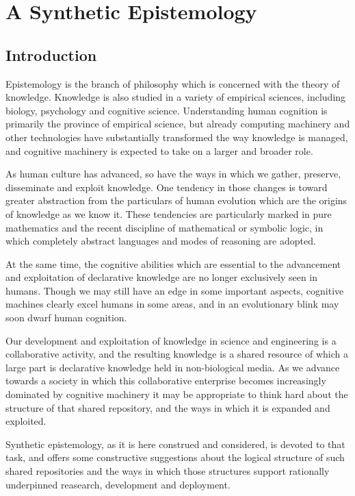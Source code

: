 \documentclass[10pt,titlepage]{book}
\begin{document}
\part{A Synthetic Epistemology}

\chapter{Introduction}

Epistemology is the branch of philosophy which is concerned with the theory of knowledge.
Knowledge is also studied in a variety of empirical sciences, including biology, psychology and cognitive science.
Understanding human cognition is primarily the province of empirical science, but already computing machinery and other technologies have substantially transformed the way knowledge is managed, and cognitive machinery is expected to take on a larger and broader role.

As human culture has advanced, so have the ways in which we gather, preserve, disseminate and exploit knowledge.
One tendency in those changes is toward greater abstraction from the particulars of human evolution which are the origins of knowledge as we know it.
These tendencies are particularly marked in pure mathematics and the recent discipline of mathematical or symbolic logic, in which completely abstract languages and modes of reasoning are adopted.

At the same time, the cognitive abilities which are essential to the advancement and exploitation of declarative knowledge are no longer exclusively seen in humans.
Though we may still have an edge in some important aspects, cognitive machines clearly excel humans in some areas, and in an evolutionary blink may soon dwarf human cognition.

Our development and exploitation of knowledge in science and engineering is a collaborative activity, and the resulting knowledge is a shared resource of which a large part is declarative knowledge held in non-biological media.
As we advance towards a society in which this collaborative enterprise becomes increasingly dominated by cognitive machinery it may be appropriate to think hard about the structure of that shared repository, and the ways in which it is expanded and exploited.

Synthetic epistemology, as it is here construed and considered, is devoted to that task, and offers some constructive suggestions about the logical structure of such shared repositories and the ways in which those structures support rationally underpinned reasearch, development and deployment.
\end{document}
